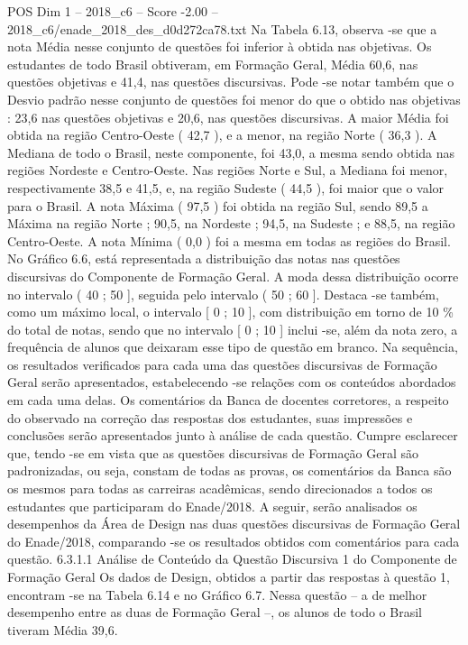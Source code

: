 \begin{textsample}{POS Dim 1 – 2018\_c6 – Score -2.00 – 2018\_c6/enade\_2018\_des\_d0d272ca78.txt}
Na Tabela 6.13, observa -se que a nota Média nesse conjunto de questões foi inferior à obtida nas objetivas.
Os estudantes de todo Brasil obtiveram, em Formação Geral, Média 60,6, nas questões objetivas e 41,4, nas questões discursivas.
Pode -se notar também que o Desvio padrão nesse conjunto de questões foi menor do que o obtido nas objetivas : 23,6 nas questões objetivas e 20,6, nas questões discursivas.
A maior Média foi obtida na região Centro-Oeste ( 42,7 ), e a menor, na região Norte ( 36,3 ).
A Mediana de todo o Brasil, neste componente, foi 43,0, a mesma sendo obtida nas regiões Nordeste e Centro-Oeste.
Nas regiões Norte e Sul, a Mediana foi menor, respectivamente 38,5 e 41,5, e, na região Sudeste ( 44,5 ), foi maior que o valor para o Brasil.
A nota Máxima ( 97,5 ) foi obtida na região Sul, sendo 89,5 a Máxima na região Norte ; 90,5, na Nordeste ; 94,5, na Sudeste ; e 88,5, na região Centro-Oeste.
A nota Mínima ( 0,0 ) foi a mesma em todas as regiões do Brasil.
No Gráfico 6.6, está representada a distribuição das notas nas questões discursivas do Componente de Formação Geral.
A moda dessa distribuição ocorre no intervalo ( 40 ; 50 ], seguida pelo intervalo ( 50 ; 60 ].
Destaca -se também, como um máximo local, o intervalo [ 0 ; 10 ], com distribuição em torno de 10 \% do total de notas, sendo que no intervalo [ 0 ; 10 ] inclui -se, além da nota zero, a frequência de alunos que deixaram esse tipo de questão em branco.
Na sequência, os resultados verificados para cada uma das questões discursivas de Formação Geral serão apresentados, estabelecendo -se relações com os conteúdos abordados em cada uma delas.
Os comentários da Banca de docentes corretores, a respeito do observado na correção das respostas dos estudantes, suas impressões e conclusões serão apresentados junto à análise de cada questão.
Cumpre esclarecer que, tendo -se em vista que as questões discursivas de Formação Geral são padronizadas, ou seja, constam de todas as provas, os comentários da Banca são os mesmos para todas as carreiras acadêmicas, sendo direcionados a todos os estudantes que participaram do Enade/2018.
A seguir, serão analisados os desempenhos da Área de Design nas duas questões discursivas de Formação Geral do Enade/2018, comparando -se os resultados obtidos com comentários para cada questão. 6.3.1.1 Análise de Conteúdo da Questão Discursiva 1 do Componente de Formação Geral Os dados de Design, obtidos a partir das respostas à questão 1, encontram -se na Tabela 6.14 e no Gráfico 6.7.
Nessa questão – a de melhor desempenho entre as duas de Formação Geral –, os alunos de todo o Brasil tiveram Média 39,6.

\end{textsample}
